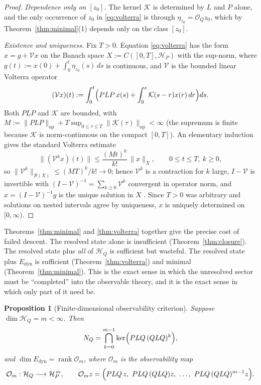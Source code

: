 \documentclass[11pt,reqno]{amsart}
\numberwithin{equation}{section}
\theoremstyle{plain}
\newtheorem{proposition}[theorem]{Proposition}
\theoremstyle{definition}
\theoremstyle{remark}
\newcommand{\HP}{\mathcal{H}_{P}}
\newcommand{\HQ}{\mathcal{H}_{Q}}
\newcommand{\Edyn}{E_{\mathrm{dyn}}}
\newcommand{\Op}{\mathcal{O}_{Q}}
\newcommand{\Kmem}{\mathcal{K}}
\DeclareMathOperator{\Rank}{rank}
\begin{document}
\begin{proof}
\emph{Dependence only on $[z_{0}]$.} The kernel $\Kmem$ is determined by $L$ and $P$ alone,
and the only occurrence of $z_{0}$ in \eqref{eq:volterra} is through
$\eta_{z_{0}}=\Op z_{0}$, which by Theorem~\ref{thm:minimal}(1) depends only on the class
$[z_{0}]$.

\emph{Existence and uniqueness.} Fix $T>0$. Equation \eqref{eq:volterra} has the form
$x=g+\mathcal{V}x$ on the Banach space $X:=C([0,T],\HP)$ with the sup-norm, where
$g(t):=x(0)+\int_{0}^{t}\eta_{z_{0}}(s)\,ds$ is continuous, and $\mathcal{V}$ is the bounded
linear Volterra operator
\[
(\mathcal{V}x)(t):=\int_{0}^{t}\Bigl(PLP\,x(s)+\int_{0}^{s}\Kmem(s-r)x(r)\,dr\Bigr)ds .
\]
Both $PLP$ and $\Kmem$ are bounded, with
$M:=\lVert PLP\rVert_{\mathrm{op}}+T\sup_{0\le\tau\le T}\lVert\Kmem(\tau)\rVert_{\mathrm{op}}<\infty$
(the supremum is finite because $\Kmem$ is norm-continuous on the compact $[0,T]$). An
elementary induction gives the standard Volterra estimate
\[
\lVert(\mathcal{V}^{k}x)(t)\rVert\le\frac{(Mt)^{k}}{k!}\,\lVert x\rVert_{X},
\qquad 0\le t\le T,\ k\ge0,
\]
so $\lVert\mathcal{V}^{k}\rVert_{\mathcal{B}(X)}\le(MT)^{k}/k!\to0$; hence
$\mathcal{V}^{k}$ is a contraction for $k$ large, $I-\mathcal{V}$ is invertible with
$(I-\mathcal{V})^{-1}=\sum_{k\ge0}\mathcal{V}^{k}$ convergent in operator norm, and
$x=(I-\mathcal{V})^{-1}g$ is the unique solution in $X$
\cite[Ch.~2, Thm.~3.5]{GripenbergLondenStaffans}. Since $T>0$ was arbitrary and solutions on
nested intervals agree by uniqueness, $x$ is uniquely determined on $[0,\infty)$.
\end{proof}

Theorems~\ref{thm:minimal} and \ref{thm:volterra} together give the precise cost of failed
descent. The resolved state alone is insufficient (Theorem~\ref{thm:closure}). The resolved
state plus \emph{all} of $\HQ$ is sufficient but wasteful. The resolved state plus $\Edyn$ is
sufficient (Theorem~\ref{thm:volterra}) and minimal (Theorem~\ref{thm:minimal}). This is the
exact sense in which the unresolved sector must be ``completed'' into the observable theory,
and it is the exact sense in which only part of it need be.

\begin{proposition}[Finite-dimensional observability criterion]
\label{prop:observability}
Suppose $\dim\HQ=m<\infty$. Then
\begin{equation}
\label{eq:NQfinite}
N_{Q}=\bigcap_{k=0}^{m-1}\ker\Bigl(PLQ\,(QLQ)^{k}\Bigr),
\end{equation}
and $\dim\Edyn=\Rank\mathcal{O}_{m}$, where $\mathcal{O}_{m}$ is the observability map
\begin{equation}
\label{eq:obsmatrix}
\mathcal{O}_{m}:\HQ\longrightarrow\HP^{\,m},
\qquad
\mathcal{O}_{m}z=\Bigl(PLQ\,z,\ PLQ\,(QLQ)z,\ \dots,\ PLQ\,(QLQ)^{m-1}z\Bigr).
\end{equation}
\end{proposition}
\end{document}

